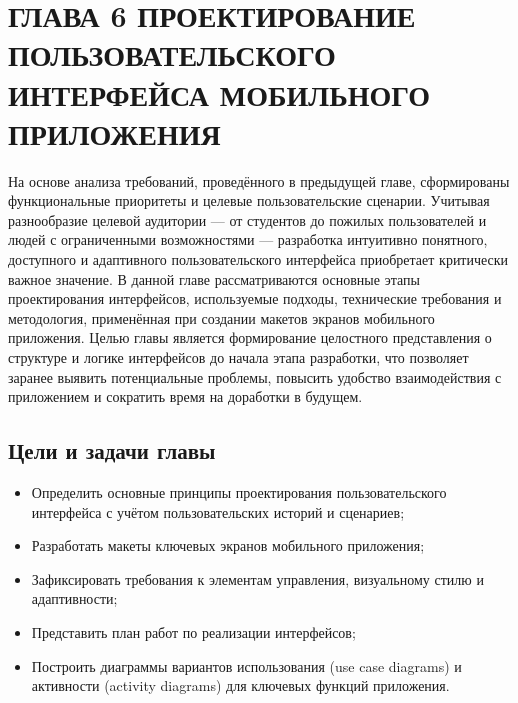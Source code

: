 \section{ГЛАВА 6 ПРОЕКТИРОВАНИЕ ПОЛЬЗОВАТЕЛЬСКОГО ИНТЕРФЕЙСА МОБИЛЬНОГО ПРИЛОЖЕНИЯ}
На основе анализа требований, проведённого в предыдущей главе, сформированы функциональные приоритеты и целевые пользовательские сценарии. Учитывая разнообразие целевой аудитории — от студентов до пожилых пользователей и людей с ограниченными возможностями — разработка интуитивно понятного, доступного и адаптивного пользовательского интерфейса приобретает критически важное значение. В данной главе рассматриваются основные этапы проектирования интерфейсов, используемые подходы, технические требования и методология, применённая при создании макетов экранов мобильного приложения.
Целью главы является формирование целостного представления о структуре и логике интерфейсов до начала этапа разработки, что позволяет заранее выявить потенциальные проблемы, повысить удобство взаимодействия с приложением и сократить время на доработки в будущем.

\subsection*{Цели и задачи главы}
\begin{itemize}
    \item Определить основные принципы проектирования пользовательского интерфейса с учётом пользовательских историй и сценариев;
    \item Разработать макеты ключевых экранов мобильного приложения;
    \item Зафиксировать требования к элементам управления, визуальному стилю и адаптивности;
    \item Представить план работ по реализации интерфейсов;
    \item Построить диаграммы вариантов использования (use case diagrams) и активности (activity diagrams) для ключевых функций приложения.
\end{itemize}

